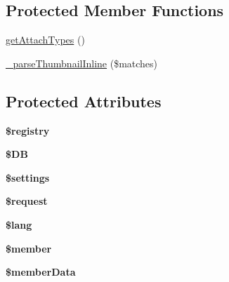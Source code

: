 \subsection*{Protected Member Functions}
\begin{DoxyCompactItemize}
\item 
\hyperlink{classclass__attach_a2eec27e8f7d3b13463fb284ec822c186}{get\-Attach\-Types} ()
\item 
\hyperlink{classclass__attach_af15eee106457e495a812be982c64f558}{\-\_\-parse\-Thumbnail\-Inline} (\$matches)
\end{DoxyCompactItemize}
\subsection*{Protected Attributes}
\begin{DoxyCompactItemize}
\item 
\hypertarget{classclass__attach_a531e4a386aaa7f3e06d3642dc38d7e80}{{\bfseries \$registry}}\label{classclass__attach_a531e4a386aaa7f3e06d3642dc38d7e80}

\item 
\hypertarget{classclass__attach_a7dc56dc8b18ad37272b56fa7395bedef}{{\bfseries \$\-D\-B}}\label{classclass__attach_a7dc56dc8b18ad37272b56fa7395bedef}

\item 
\hypertarget{classclass__attach_ac7c3353107070daa85f641882931b358}{{\bfseries \$settings}}\label{classclass__attach_ac7c3353107070daa85f641882931b358}

\item 
\hypertarget{classclass__attach_abb35c8495a232b510389fa6d7b15d38a}{{\bfseries \$request}}\label{classclass__attach_abb35c8495a232b510389fa6d7b15d38a}

\item 
\hypertarget{classclass__attach_a7714b111b644017933931ec69a154102}{{\bfseries \$lang}}\label{classclass__attach_a7714b111b644017933931ec69a154102}

\item 
\hypertarget{classclass__attach_a5e1c849c6148a8732eee400fcee0d044}{{\bfseries \$member}}\label{classclass__attach_a5e1c849c6148a8732eee400fcee0d044}

\item 
\hypertarget{classclass__attach_ae9d848ba2cf6eee63bdc060e2dfcf95a}{{\bfseries \$member\-Data}}\label{classclass__attach_ae9d848ba2cf6eee63bdc060e2dfcf95a}

\end{DoxyCompactItemize}


